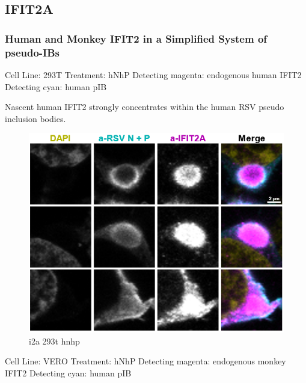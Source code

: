\subsection{IFIT2A} \label{subsec:IFIT2A}
\subsubsection{Human and Monkey IFIT2 in a Simplified System of pseudo-IBs} \label{Human and Monkey IFIT2 in a Simplified System of pseudo-IBs}
Cell Line: 293T \newline
Treatment: hNhP \newline
Detecting magenta: endogenous human IFIT2 \newline
Detecting cyan: human pIB \newline

Nascent human IFIT2 strongly concentrates within the human RSV pseudo inclusion bodies.

\begin{figure}
    \centering
    \includegraphics[width=1\linewidth]{10. Chapter 5//Figs//01. I2A/01. i2a 293t hnhp.png}
    \caption[i2a 293t hnhp]{i2a 293t hnhp}
    \label{fig:i2a 293t hnhp}
\end{figure}

Cell Line: VERO \newline
Treatment: hNhP \newline
Detecting magenta: endogenous monkey IFIT2 \newline
Detecting cyan: human pIB \newline


